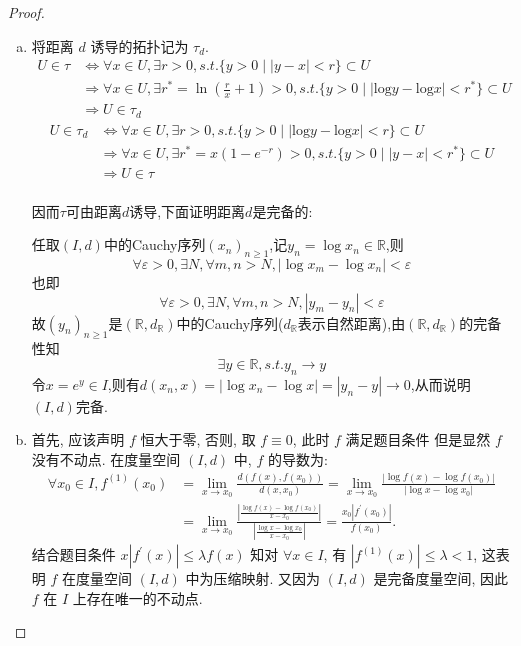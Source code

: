 \begin{proof}
  \begin{enumerate}[(a)]
    \item 将距离 $d$ 诱导的拓扑记为 $\tau _d$.
    \[\begin{split}U\in\tau&\Leftrightarrow\forall x\in U,\exists r>0,s.t.\{y>0\mid|y-x|<r\}\subset U\\&\Rightarrow\forall x\in U,\exists r^{*}=\ln\left(\frac{r}{x}+1\right)>0,s.t.\{y>0\mid|\textrm{log}y-\textrm{log}x|<r^{*}\}\subset U\\&\Rightarrow U\in\tau _d\end{split}\]
    \[\begin{split}U\in\tau_d&\Leftrightarrow\forall x\in U,\exists r>0,s.t.\{y>0\mid|\textrm{log}y-\textrm{log}x|<r\}\subset U\\&\Rightarrow\forall x\in U,\exists r^{*}=x(1-e^{-r})>0,s.t.\{y>0\mid|y-x|<r^{*}\}\subset U\\&\Rightarrow U\in\tau\end{split}\]\\
    因而$\tau$可由距离$d$诱导,下面证明距离$d$是完备的:

    任取$(I,d)$中的Cauchy序列$(x_n)_{n\geq 1}$,记$y_n=\log x_n\in\mathbb{R}$,则
    \[\forall\varepsilon >0,\exists N,\forall m,n>N,|\log x_m-\log x_n|<\varepsilon\]
    也即
    \[\forall\varepsilon >0,\exists N,\forall m,n>N,|y_m-y_n|<\varepsilon\]
    故$(y_n)_{n\geq 1}$是$(\mathbb{R},d_{\mathbb{R}})$中的Cauchy序列($d_{\mathbb{R}}$表示自然距离),由$(\mathbb{R},d_{\mathbb{R}})$的完备性知\[\exists y\in\mathbb{R},s.t.y_n\rightarrow y\]
    令$x=e^y\in I$,则有$d(x_n,x)=|\log x_n-\log x|=|y_n-y|\rightarrow 0$,从而说明$(I,d)$完备.
    \item 首先, 应该声明 $f$ 恒大于零, 否则, 取 $f\equiv 0$, 此时 $f$ 满足题目条件
    但是显然 $f$ 没有不动点.
    在度量空间 $(I,d)$ 中, $f$ 的导数为:
    \begin{align*}
        \forall x_0\in I,f^{(1)}(x_0)
        & =\lim_{x\to x_0}\frac{d(f(x),f(x_0))}{d(x,x_0)}=\lim_{x\to x_0}\frac{|\log f(x)-\log f(x_0)|}{|\log x-\log x_0|}\\
        & =\lim_{x\to x_0}\frac{\left|\frac{\log f(x)-\log f(x_0)}{x-x_0}\right|}{\left|\frac{\log x-\log x_0}{x-x_0}\right|}=\frac{x_0|f^{\prime}(x_0)|}{f(x_0)}.
    \end{align*}
    结合题目条件 $x|f^{\prime}(x)|\leq\lambda f(x)$
    知对 $\forall x\in I$, 有 $|f^{(1)}(x)|\leq\lambda<1$, 
    这表明 $f$ 在度量空间 $(I,d)$ 中为压缩映射.
    又因为 $(I,d)$ 是完备度量空间, 因此 $f$ 在 $I$ 上存在唯一的不动点.
  \end{enumerate}
\end{proof}



